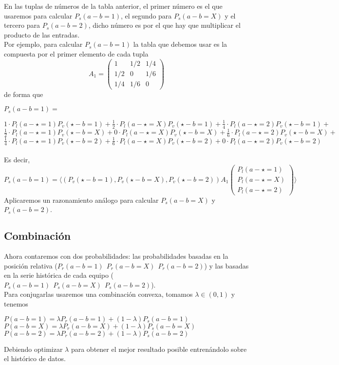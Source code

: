 En las tuplas de números de la tabla anterior, el primer número es el que usaremos para calcular $P_{s}(a-b=1)$, el segundo para $P_{s}(a-b=X)$ y el tercero para $P_{s}(a-b=2)$, dicho número es por el que hay que multiplicar el producto de las entradas.\\
Por ejemplo, para calcular $P_{s}(a-b=1)$ la tabla que debemos usar es la compuesta por el primer elemento de cada tupla\\
\[
A_{1}= \left(\begin{array}{ccc}
1 & 1/2 & 1/4\\
1/2 & 0 & 1/6\\
1/4 & 1/6 & 0
\end{array} \right)
\]
de forma que
	\begin{center}
		$P_{s}(a-b=1)=$
	\end{center}
	$1\cdotp P_{l}(a - \star=1)P_{v}(\star - b=1) + \frac{1}{2}\cdotp P_{l}(a - \star=X)P_{v}(\star - b=1) + \frac{1}{4}\cdotp P_{l}(a - \star=2)P_{v}(\star - b=1)+$\\ 
	$\frac{1}{2}\cdotp P_{l}(a - \star=1)P_{v}(\star - b=X) + 0\cdotp P_{l}(a - \star=X)P_{v}(\star - b=X) + \frac{1}{6}\cdotp P_{l}(a - \star=2)P_{v}(\star - b=X)+$\\
	$\frac{1}{4}\cdotp P_{l}(a - \star=1)P_{v}(\star - b=2) + \frac{1}{6}\cdotp P_{l}(a - \star=X)P_{v}(\star - b=2) + 0\cdotp P_{l}(a - \star=2)P_{v}(\star - b=2)$ \\
\ \\	
Es decir, $P_{s}(a-b=1)= 
\langle
(P_{v}(\star - b=1),P_{v}(\star - b=X),P_{v}(\star - b=2)) A_{1}  
\left(\begin{array}{c}
P_{l}(a - \star=1)\\
P_{l}(a - \star=X)\\
P_{l}(a - \star=2)
\end{array} \right)
\rangle $\\

Aplicaremos un razonamiento análogo para calcular $P_{s}(a-b=X)$ y $P_{s}(a-b=2)$.

\subsection*{Combinación}
Ahora contaremos con dos probabilidades: las probabilidades basadas en la posición relativa ($P_{r}(a-b=1) \ \ P_{r}(a-b=X) \ \ P_{r}(a-b=2)$) y las basadas en la serie histórica de cada equipo ($P_{s}(a-b=1) \ \ P_{s}(a-b=X) \ \ P_{s}(a-b=2)$).\\

Para conjugarlas usaremos una combinación convexa, tomamos $\lambda \in (0,1)$ y tenemos
\begin{center}
	$ P(a-b=1) = \lambda P_{r}(a-b=1) + (1-\lambda) P_{s}(a-b=1)$\\
	$ P(a-b=X) = \lambda P_{r}(a-b=X) + (1-\lambda) P_{s}(a-b=X)$\\
	$ P(a-b=2) = \lambda P_{r}(a-b=2) + (1-\lambda) P_{s}(a-b=2)$
\end{center}
Debiendo optimizar $\lambda$ para obtener el mejor resultado posible entrenándolo sobre el histórico de datos.